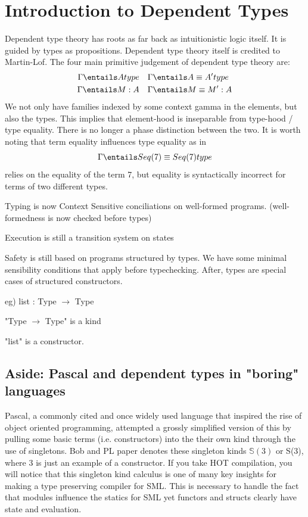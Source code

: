 \documentclass[11pt]{article}
\begin{document}
\section*{Introduction to Dependent Types}

Dependent type theory has roots as far back as intuitionistic logic itself. It is guided by types as propositions. Dependent type theory itself is credited to Martin-Lof. The four main primitive judgement of dependent type theory are:
\begin{align*}
    \Gamma \entails A type \quad & \Gamma \entails A \equiv A' type \\
    \Gamma \entails M : A \quad & \Gamma \entails M \equiv M' : A \\
\end{align*}
We not only have families indexed by some context gamma in the elements, but also the types. This implies that element-hood is inseparable from type-hood / type equality. There is no longer a phase distinction between the two. It is worth noting that term equality influences type equality as in 
$$\Gamma \entails Seq(7) \equiv Seq(7) type$$
relies on the equality of the term 7, but equality is syntactically incorrect for terms of two different types.

Typing is now Context Sensitive conciliations on well-formed programs. (well-formedness is now checked before types) 

Execution is still a transition system on states

Safety is still based on programs structured by types. We have some minimal sensibility conditions that apply before typechecking. After, types are special cases of structured constructors.

eg) list : Type $\rightarrow$ Type

"Type $\rightarrow$ Type" is a kind 

"list" is a constructor.

\subsection*{Aside: Pascal and dependent types in "boring" languages}

Pascal, a commonly cited and once widely used language that inspired the rise of object oriented programming, attempted a grossly simplified version of this by pulling some basic terms (i.e. constructors) into the their own kind through the use of singletons. Bob and PL paper denotes these singleton kinds $\mathbb{S}(3)$ or S(3), where 3 is just an example of a constructor. If you take HOT compilation, you will notice that this singleton kind calculus is one of many key insights for making a type preserving compiler for SML. This is necessary to handle the fact that modules influence the statics for SML yet functors and structs clearly have state and evaluation. 
\end{document}
